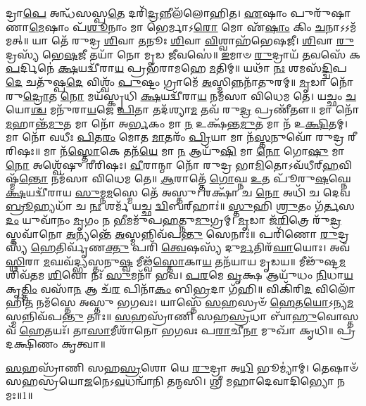 
𑌦𑍍𑌰𑌾\-\ul{𑌪𑍇} 𑌅𑌨𑍍𑌧᳴𑌸𑌸𑍍𑌪\-\ul{𑌤𑍇} 𑌦𑌰𑌿᳴\-\ul{𑌦𑍍𑌰}\-𑌨𑍍𑌨𑍀𑌲᳴𑌲𑍋𑌹𑌿𑌤। \ul{𑌏}\-𑌷𑌾𑌂 𑌪𑍁𑌰𑍁᳴𑌷𑌾𑌣𑌾\-\ul{𑌮𑍇}\-𑌷𑌾𑌂 𑌪᳴\-\ul{𑌶𑍂}\-𑌨𑌾𑌂 𑌮𑌾 𑌭𑍇𑌰𑍍𑌮𑌾𑌽\-\ul{𑌰𑍋} 𑌮𑍋 𑌏᳴\-\ul{𑌷𑌾𑌂} 𑌕𑌿𑌂 \ul{𑌚}\-𑌨𑌾𑌽𑌽𑌮᳴𑌮𑌤𑍍॥ 𑌯𑌾 𑌤𑍇᳴ 𑌰𑍁𑌦𑍍𑌰 \ul{𑌶𑌿}\-𑌵𑌾 \ul{𑌤}\-𑌨𑍂𑌃 \ul{𑌶𑌿}\-𑌵𑌾 \ul{𑌵𑌿}\-𑌶𑍍𑌵𑌾𑌹᳴𑌭𑍇𑌷𑌜𑍀। \ul{𑌶𑌿}\-𑌵𑌾 \ul{𑌰𑍁}\-𑌦𑍍𑌰𑌸𑍍𑌯᳴ 𑌭𑍇\-\ul{𑌷}\-𑌜𑍀 𑌤𑌯𑌾᳴ 𑌨𑍋 𑌮𑍃𑌡 \ul{𑌜𑍀}\-𑌵𑌸𑍇॑॥ \ul{𑌇}\-𑌮𑌾𑍞 \ul{𑌰𑍁}\-𑌦𑍍𑌰𑌾𑌯᳴ \ul{𑌤}\-𑌵𑌸𑍇᳴ 𑌕\-\ul{𑌪}\-𑌰𑍍𑌦𑌿𑌨𑍇॑ \ul{𑌕𑍍𑌷}\-𑌯𑌦𑍍𑌵𑍀᳴𑌰𑌾\-\ul{𑌯} 𑌪𑍍𑌰𑌭᳴𑌰𑌾𑌮𑌹𑍇 \ul{𑌮}\-𑌤𑌿𑌮𑍍॥ 𑌯𑌥𑌾᳴ \ul{𑌨𑌃} 𑌶𑌮𑌸᳴\-\ul{𑌦𑍍𑌦𑍍𑌵𑌿}\-𑌪\-\ul{𑌦𑍇} 𑌚𑌤𑍁᳴𑌷𑍍𑌪\-\ul{𑌦𑍇} 𑌵𑌿𑌶𑍍𑌵𑌂᳴ \ul{𑌪𑍁}\-𑌷𑍍𑌟𑌂 𑌗𑍍𑌰𑌾𑌮𑍇᳴ \ul{𑌅}\-𑌸𑍍𑌮𑌿𑌨𑍍𑌨𑌨𑌾᳴𑌤𑍁𑌰𑌮𑍍॥ \ul{𑌮𑍃}\-𑌡𑌾 𑌨𑍋᳴ 𑌰𑍁\-\ul{𑌦𑍍𑌰𑍋}\-𑌤 \ul{𑌨𑍋} 𑌮𑌯᳴𑌸𑍍𑌕𑍃𑌧𑌿 \ul{𑌕𑍍𑌷}\-𑌯𑌦𑍍𑌵𑍀᳴𑌰𑌾\-\ul{𑌯} 𑌨𑌮᳴𑌸𑌾 𑌵𑌿𑌧𑍇𑌮 𑌤𑍇। 𑌯𑌚𑍍𑌛𑌂 \ul{𑌚} 𑌯𑍋\-\ul{𑌶𑍍𑌚} 𑌮𑌨𑍁᳴𑌰𑌾\-\ul{𑌯}\-𑌜𑍇 \ul{𑌪𑌿}\-𑌤𑌾 𑌤𑌦᳴𑌶𑍍𑌯𑌾\-\ul{𑌮} 𑌤𑌵᳴ 𑌰𑍁\-\ul{𑌦𑍍𑌰} 𑌪𑍍𑌰𑌣𑍀᳴𑌤𑍗॥ 𑌮𑌾 𑌨𑍋᳴ \ul{𑌮}\-𑌹𑌾𑌨𑍍𑌤᳴\-\ul{𑌮𑍁}\-𑌤 𑌮𑌾 𑌨𑍋᳴ 𑌅\-\ul{𑌰𑍍𑌭}\-𑌕𑌂 𑌮𑌾 \ul{𑌨} 𑌉𑌕𑍍𑌷᳴𑌨𑍍𑌤\-\ul{𑌮𑍁}\-𑌤 𑌮𑌾 𑌨᳴ 𑌉\-\ul{𑌕𑍍𑌷𑌿}\-𑌤𑌮𑍍। 𑌮𑌾 𑌨𑍋᳴ 𑌵𑌧𑍀𑌃 \ul{𑌪𑌿}\-𑌤\-\ul{𑌰𑌂} 𑌮𑍋𑌤 \ul{𑌮𑌾}\-𑌤𑌰𑌂᳴ \ul{𑌪𑍍𑌰𑌿}\-𑌯𑌾 𑌮𑌾 𑌨᳴\-\ul{𑌸𑍍𑌤}\-𑌨𑍁𑌵𑍋᳴ 𑌰𑍁𑌦𑍍𑌰 𑌰𑍀𑌰𑌿𑌷𑌃॥ 𑌮𑌾 𑌨᳴\-\ul{𑌸𑍍𑌤𑍋}\-𑌕𑍇 𑌤𑌨᳴\-\ul{𑌯𑍇} 𑌮𑌾 \ul{𑌨} 𑌆𑌯𑍁᳴\-\ul{𑌷𑌿} 𑌮𑌾 \ul{𑌨𑍋} 𑌗𑍋\-\ul{𑌷𑍁} 𑌮𑌾 \ul{𑌨𑍋} 𑌅𑌶𑍍𑌵𑍇᳴𑌷𑍁 𑌰𑍀𑌰𑌿𑌷𑌃। \ul{𑌵𑍀}\-𑌰𑌾𑌨𑍍𑌮𑌾 𑌨𑍋᳴ 𑌰𑍁𑌦𑍍𑌰 𑌭𑌾\-\ul{𑌮𑌿}\-𑌤𑍋𑌽𑌵᳴𑌧𑍀𑌰𑍍‌\-\ul{𑌹}\-𑌵𑌿𑌷𑍍𑌮᳴\-\ul{𑌨𑍍𑌤𑍋} 𑌨𑌮᳴𑌸𑌾 𑌵𑌿𑌧𑍇𑌮 𑌤𑍇॥ \ul{𑌆}\-𑌰𑌾𑌤𑍍𑌤𑍇᳴ \ul{𑌗𑍋}\-𑌘𑍍𑌨 \ul{𑌉}\-𑌤 𑌪𑍂᳴𑌰𑍁\-\ul{𑌷}\-𑌘𑍍𑌨𑍇 \ul{𑌕𑍍𑌷}\-𑌯𑌦𑍍𑌵𑍀᳴𑌰𑌾𑌯 \ul{𑌸𑍁}\-𑌮𑍍𑌨\-\ul{𑌮}\-𑌸𑍍𑌮𑍇 𑌤𑍇᳴ 𑌅𑌸𑍍𑌤𑍁। 𑌰𑌕𑍍𑌷𑌾᳴ 𑌚 \ul{𑌨𑍋} 𑌅𑌧𑌿᳴ 𑌚 𑌦𑍇𑌵 \ul{𑌬𑍍𑌰𑍂}\-𑌹𑍍𑌯𑌧𑌾᳴ 𑌚 \ul{𑌨𑌃} 𑌶𑌰𑍍𑌮᳴ 𑌯𑌚𑍍𑌛 \ul{𑌦𑍍𑌵𑌿}\-𑌬𑌰𑍍‌𑌹𑌾𑌃॑॥ \ul{𑌸𑍍𑌤𑍁}\-𑌹𑌿 \ul{𑌶𑍍𑌰𑍁}\-𑌤𑌂 𑌗᳴\-\ul{𑌰𑍍𑌤}\-𑌸\-\ul{𑌦𑌂} 𑌯𑍁𑌵𑌾᳴𑌨𑌂 \ul{𑌮𑍃}\-𑌗𑌂 𑌨 \ul{𑌭𑍀}\-𑌮𑌮𑍁᳴𑌪\-\ul{𑌹}\-𑌤𑍍𑌨𑍁\-\ul{𑌮𑍁}\-𑌗𑍍𑌰𑌮𑍍। \ul{𑌮𑍃}\-𑌡𑌾 𑌜᳴\-\ul{𑌰𑌿}\-𑌤𑍍𑌰𑍇 𑌰𑍁᳴\-\ul{𑌦𑍍𑌰} 𑌸𑍍𑌤𑌵𑌾᳴𑌨𑍋 \ul{𑌅}\-𑌨𑍍𑌯𑌨𑍍𑌤𑍇᳴ \ul{𑌅}\-𑌸𑍍𑌮𑌨𑍍𑌨𑌿𑌵᳴𑌪\-\ul{𑌨𑍍𑌤𑍁} 𑌸𑍇𑌨𑌾𑌃॑॥ 𑌪𑌰𑌿᳴𑌣𑍋 \ul{𑌰𑍁}\-𑌦𑍍𑌰𑌸𑍍𑌯᳴ \ul{𑌹𑍇}\-𑌤𑌿𑌰𑍍𑌵𑍃᳴𑌣\-\ul{𑌕𑍍𑌤𑍁} 𑌪𑌰𑌿᳴ \ul{𑌤𑍍𑌵𑍇}\-𑌷𑌸𑍍𑌯᳴ 𑌦𑍁\-\ul{𑌰𑍍𑌮}\-𑌤𑌿𑌰᳴\-\ul{𑌘𑌾}\-𑌯𑍋𑌃। 𑌅𑌵᳴ \ul{𑌸𑍍𑌥𑌿}\-𑌰𑌾 \ul{𑌮}\-𑌘𑌵᳴𑌦𑍍𑌭𑍍𑌯𑌸𑍍𑌤𑌨𑍁\-\ul{𑌷𑍍𑌵} 𑌮𑍀𑌢𑍍𑌵᳴\-\ul{𑌸𑍍𑌤𑍋}\-𑌕𑌾\-\ul{𑌯} 𑌤𑌨᳴𑌯𑌾𑌯 𑌮𑍃𑌡𑌯॥ 𑌮𑍀𑌢𑍁᳴𑌷𑍍𑌟\-\ul{𑌮} 𑌶𑌿𑌵᳴𑌤𑌮 \ul{𑌶𑌿}\-𑌵𑍋 𑌨𑌃᳴ \ul{𑌸𑍁}\-𑌮𑌨𑌾᳴ 𑌭𑌵। \ul{𑌪}\-\-\ul{𑌰}\-𑌮𑍇 \ul{𑌵𑍃}\-𑌕𑍍𑌷 𑌆𑌯𑍁᳴𑌧𑌂 \ul{𑌨𑌿}\-𑌧𑌾\-\ul{𑌯} 𑌕𑍃\-\ul{𑌤𑍍𑌤𑌿𑌂} 𑌵𑌸𑌾᳴\-\ul{𑌨} 𑌆 𑌚᳴\-\ul{𑌰} 𑌪𑌿𑌨𑌾᳴\-\ul{𑌕𑌂} 𑌬𑌿\-\ul{𑌭𑍍𑌰}\-𑌦𑌾 𑌗᳴𑌹𑌿॥ 𑌵𑌿𑌕𑌿᳴𑌰𑌿\-\ul{𑌦} 𑌵𑌿𑌲𑍋᳴𑌹𑌿\-\ul{𑌤} 𑌨𑌮᳴𑌸𑍍𑌤𑍇 𑌅𑌸𑍍𑌤𑍁 𑌭𑌗𑌵𑌃। 𑌯𑌾𑌸𑍍𑌤𑍇᳴ \ul{𑌸}\-𑌹𑌸𑍍𑌰𑍞᳴ \ul{𑌹𑍇}\-𑌤\-\ul{𑌯𑍋}\-𑌽𑌨𑍍𑌯\-\ul{𑌮}\-𑌸𑍍𑌮𑌨𑍍𑌨𑌿𑌵᳴𑌪\-\ul{𑌨𑍍𑌤𑍁} 𑌤𑌾𑌃॥ \ul{𑌸}\-𑌹𑌸𑍍𑌰𑌾᳴𑌣𑌿 𑌸𑌹\-\ul{𑌸𑍍𑌰}\-𑌧𑌾 𑌬𑌾᳴\-\ul{𑌹𑍁}\-𑌵𑍋𑌸𑍍𑌤𑌵᳴ \ul{𑌹𑍇}\-𑌤𑌯𑌃᳴। 𑌤𑌾\-\ul{𑌸𑌾}\-𑌮𑍀𑌶𑌾᳴𑌨𑍋 𑌭𑌗𑌵𑌃 𑌪\-\ul{𑌰𑌾}\-𑌚𑍀\-\ul{𑌨𑌾} 𑌮𑍁𑌖𑌾᳴ 𑌕𑍃𑌧𑌿॥
𑌪𑍍𑌰𑌦𑌕𑍍𑌷𑌿𑌣𑌂 𑌕𑍃𑌤𑍍𑌵𑌾॥


{\small \closesection}



\-\ul{𑌸}\-𑌹𑌸𑍍𑌰𑌾᳴𑌣𑌿 𑌸𑌹\-\ul{𑌸𑍍𑌰}\-𑌶𑍋 𑌯𑍇 \ul{𑌰𑍁}\-𑌦𑍍𑌰𑌾 𑌅\-\ul{𑌧𑌿} 𑌭𑍂𑌮𑍍𑌯𑌾॑𑌮𑍍। 𑌤𑍇𑌷𑌾𑍞᳴ 𑌸𑌹𑌸𑍍𑌰𑌯𑍋\-\ul{𑌜}\-𑌨𑍇\-𑌽\-\ul{𑌵}\-𑌧𑌨𑍍𑌵𑌾᳴𑌨𑌿 𑌤𑌨𑍍𑌮𑌸𑌿। 𑌶𑍍𑌰𑍀 𑌮𑌹𑌾𑌦𑍇𑌵𑌾𑌦𑌿𑌭𑍍𑌯𑍋 𑌨𑌮𑌃॥1॥

